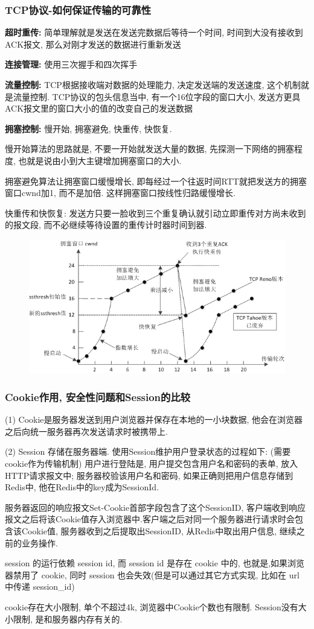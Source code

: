 \documentclass[UTF8]{ctexart}
\begin{document}
\subsubsection{TCP协议-如何保证传输的可靠性}
\textbf{超时重传:} 简单理解就是发送在发送完数据后等待一个时间, 时间到大没有接收到ACK报文, 那么对刚才发送的数据进行重新发送
\par
\textbf{连接管理:} 使用三次握手和四次挥手
\par
\textbf{流量控制:} TCP根据接收端对数据的处理能力, 决定发送端的发送速度, 这个机制就是流量控制. TCP协议的包头信息当中, 有一个16位字段的窗口大小, 发送方更具ACK报文里的窗口大小的值的改变自己的发送数据
\par
\textbf{拥塞控制:} 慢开始, 拥塞避免, 快重传, 快恢复.
\par
慢开始算法的思路就是, 不要一开始就发送大量的数据, 先探测一下网络的拥塞程度, 也就是说由小到大主键增加拥塞窗口的大小.
\par
拥塞避免算法让拥塞窗口缓慢增长, 即每经过一个往返时间RTT就把发送方的拥塞窗口cwnd加1, 而不是加倍. 这样拥塞窗口按线性归路缓慢增长.
\par
快重传和快恢复: 发送方只要一脸收到三个重复确认就引动立即重传对方尚未收到的报文段, 而不必继续等待设置的重传计时器时间到器.
\begin{figure}
	\centering
	\includegraphics[width=0.7\linewidth]{figures/tcp.png}
	\caption{}
	\label{fig:tcp}
\end{figure}
\subsubsection{Cookie作用, 安全性问题和Session的比较}
(1) Cookie是服务器发送到用户浏览器并保存在本地的一小块数据,  他会在浏览器之后向统一服务器再次发送请求时被携带上.
\par
(2) Session 存储在服务器端. 使用Session维护用户登录状态的过程如下: (需要cookie作为传输机制)
用户进行登陆是, 用户提交包含用户名和密码的表单, 放入HTTP请求报文中;
服务器校验该用户名和密码, 如果正确则把用户信息存储到Redis中, 他在Redis中的key成为SessionId.
\par
服务器返回的响应报文Set-Cookie首部字段包含了这个SessionID, 客户端收到响应报文之后将该Cookie值存入浏览器中.客户端之后对同一个服务器进行请求时会包含该Cookie值, 服务器收到之后提取出SessionID, 从Redis中取出用户信息, 继续之前的业务操作.
\par
session 的运行依赖 session id, 而 session id 是存在 cookie 中的, 也就是,如果浏览器禁用了 cookie, 同时 session 也会失效(但是可以通过其它方式实现, 比如在 url 中传递 session\_id)
\par
cookie存在大小限制, 单个不超过4k, 浏览器中Cookie个数也有限制.
Session没有大小限制, 是和服务器内存有关的.
\end{document}
